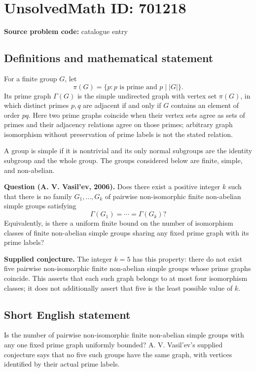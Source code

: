 \documentclass[11pt]{article}
\begin{document}
\section*{UnsolvedMath ID: 701218}
\textbf{Source problem code:} catalogue entry
\subsection{Definitions and mathematical statement}
For a finite group \(G\), let
\[
\pi(G)=\{p:p\text{ is prime and }p\mid |G|\}.
\]
Its prime graph \(\Gamma(G)\) is the simple undirected graph with vertex set \(\pi(G)\), in which distinct primes \(p,q\) are adjacent if and only if \(G\) contains an element of order \(pq\). Here two prime graphs coincide when their vertex sets agree as sets of primes and their adjacency relations agree on those primes; arbitrary graph isomorphism without preservation of prime labels is not the stated relation.

A group is simple if it is nontrivial and its only normal subgroups are the identity subgroup and the whole group. The groups considered below are finite, simple, and non-abelian.

\textbf{Question (A. V. Vasil'ev, 2006).} Does there exist a positive integer \(k\) such that there is no family \(G_1,\ldots,G_k\) of pairwise non-isomorphic finite non-abelian simple groups satisfying
\[
\Gamma(G_1)=\cdots=\Gamma(G_k)?
\]
Equivalently, is there a uniform finite bound on the number of isomorphism classes of finite non-abelian simple groups sharing any fixed prime graph with its prime labels?

\textbf{Supplied conjecture.} The integer \(k=5\) has this property: there do not exist five pairwise non-isomorphic finite non-abelian simple groups whose prime graphs coincide. This asserts that each such graph belongs to at most four isomorphism classes; it does not additionally assert that five is the least possible value of \(k\).
\subsection{Short English statement}
Is the number of pairwise non-isomorphic finite non-abelian simple groups with any one fixed prime graph uniformly bounded? A. V. Vasil'ev's supplied conjecture says that no five such groups have the same graph, with vertices identified by their actual prime labels.
\end{document}
